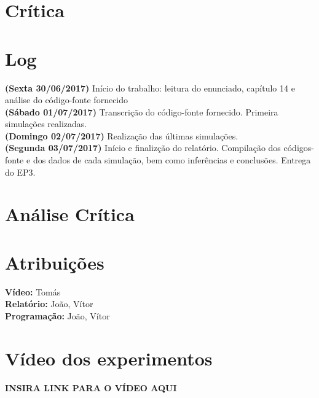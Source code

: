 \documentclass{article}
\begin{document}
\paragraph{}
 

\section{Crítica}
\paragraph{}

\section{Log}
\textbf{(Sexta 30/06/2017)} Início do trabalho: leitura do enunciado, capítulo 14 e análise do código-fonte fornecido \\
\textbf{(Sábado 01/07/2017)} Transcrição do código-fonte fornecido. Primeira simulações realizadas. \\
\textbf{(Domingo  02/07/2017)} Realização das últimas simulações. \\
\textbf{(Segunda  03/07/2017)} Início e finalizção do relatório. Compilação dos códigos-fonte e dos dados de cada simulação, bem como inferências e conclusões. Entrega do EP3. \\

\section{Análise Crítica}
\paragraph{}


\section{Atribuições}
\textbf{Vídeo:} Tomás \\
\textbf{Relatório:} João, Vítor \\
\textbf{Programação:} João, Vítor

\section{Vídeo dos experimentos}

\textbf{INSIRA LINK PARA O VÍDEO AQUI}
\end{document}
